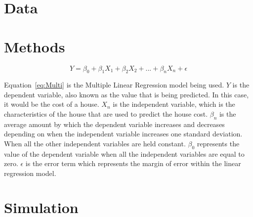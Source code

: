 \documentclass[12pt]{article}
\begin{document}
\section{Data}
\label{sec:data}



\section{Methods}
\label{sec:meth}



\begin{equation}
  \label{eq:Multi}
  Y = \beta_{0} + \beta_{1}X_{1} + \beta_{2}X_{2} + ... + \beta_{n}X_{n} + \epsilon
\end{equation}

Equation~\ref{eq:Multi} is the Multiple Linear Regression model being used. \(Y\) is the dependent variable, also known as the value that is being predicted. In this case, it would be the cost of a house. \(X_{n}\) is the independent variable, which is the characteristics of the house that are used to predict the house cost. \(\beta_{n}\) is the average amount by which the dependent variable increases and decreases depending on when the independent variable increases one standard deviation. When all the other independent variables are held constant. \(\beta_{0}\) represents the value of the dependent variable when all the independent variables are equal to zero. \(\epsilon\) is the error term which represents the margin of error within the linear regression model. 

\section{Simulation}
\label{sec:sim}

\end{document}
